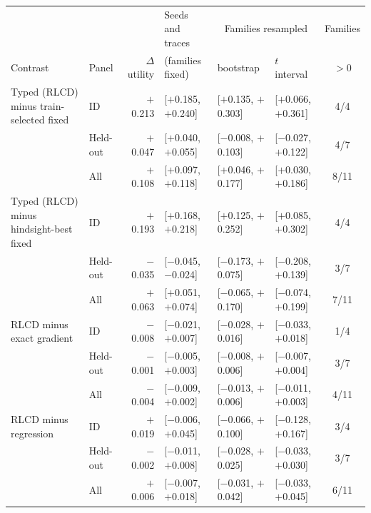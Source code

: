 \begin{tabular}{llrlllc}
\toprule
 & & & Seeds and traces & \multicolumn{2}{c}{Families resampled} & Families \\
Contrast & Panel & $\Delta$ utility & (families fixed) & bootstrap & $t$ interval & $>0$ \\
\midrule
Typed (RLCD) minus train-selected fixed & ID & $+$0.213 & [$+$0.185, $+$0.240] & [$+$0.135, $+$0.303] & [$+$0.066, $+$0.361] & 4/4 \\
 & Held-out & $+$0.047 & [$+$0.040, $+$0.055] & [$-$0.008, $+$0.103] & [$-$0.027, $+$0.122] & 4/7 \\
 & All & $+$0.108 & [$+$0.097, $+$0.118] & [$+$0.046, $+$0.177] & [$+$0.030, $+$0.186] & 8/11 \\
\midrule
Typed (RLCD) minus hindsight-best fixed & ID & $+$0.193 & [$+$0.168, $+$0.218] & [$+$0.125, $+$0.252] & [$+$0.085, $+$0.302] & 4/4 \\
 & Held-out & $-$0.035 & [$-$0.045, $-$0.024] & [$-$0.173, $+$0.075] & [$-$0.208, $+$0.139] & 3/7 \\
 & All & $+$0.063 & [$+$0.051, $+$0.074] & [$-$0.065, $+$0.170] & [$-$0.074, $+$0.199] & 7/11 \\
\midrule
RLCD minus exact gradient & ID & $-$0.008 & [$-$0.021, $+$0.007] & [$-$0.028, $+$0.016] & [$-$0.033, $+$0.018] & 1/4 \\
 & Held-out & $-$0.001 & [$-$0.005, $+$0.003] & [$-$0.008, $+$0.006] & [$-$0.007, $+$0.004] & 3/7 \\
 & All & $-$0.004 & [$-$0.009, $+$0.002] & [$-$0.013, $+$0.006] & [$-$0.011, $+$0.003] & 4/11 \\
\midrule
RLCD minus regression & ID & $+$0.019 & [$-$0.006, $+$0.045] & [$-$0.066, $+$0.100] & [$-$0.128, $+$0.167] & 3/4 \\
 & Held-out & $-$0.002 & [$-$0.011, $+$0.008] & [$-$0.028, $+$0.025] & [$-$0.033, $+$0.030] & 3/7 \\
 & All & $+$0.006 & [$-$0.007, $+$0.018] & [$-$0.031, $+$0.042] & [$-$0.033, $+$0.045] & 6/11 \\
\bottomrule
\end{tabular}
